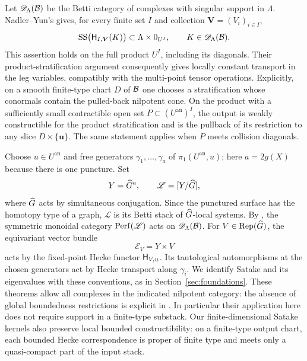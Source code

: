 Let $\mathscr D_\Lambda(\mathcal B)$ be the Betti category of complexes with
singular support in $\Lambda$.  Nadler--Yun's
\cite[Theorem~6.2.2]{NY} gives, for every finite set $I$ and collection
$\boldsymbol V=(V_i)_{i\in I}$,
\begin{equation}\label{eq:perverse-NY-support}
 \operatorname{SS}\bigl(\mathsf H_{I,\boldsymbol V}(K)\bigr)
       \subset \Lambda\times 0_{U^I},
       \qquad K\in\mathscr D_\Lambda(\mathcal B).
\end{equation}
This assertion holds on the full product $U^I$, including its diagonals.
Their product-stratification argument
\cite[Proposition~6.3.2]{NY} consequently gives locally constant
transport in the leg variables, compatibly with the multi-point tensor
operations.  Explicitly, on a smooth finite-type chart $D$ of $\mathcal B$ one
chooses a stratification whose conormals contain the pulled-back
nilpotent cone.  On the product with a sufficiently small contractible
open set $P\subset (U^{\mathrm{an}})^I$, the output is weakly
constructible for the product stratification and is the pullback of its restriction
to any slice $D\times\{\boldsymbol u\}$.  The same statement applies
when $P$ meets collision diagonals.

Choose $u\in U^{\mathrm{an}}$ and free generators
$\gamma_1,\ldots,\gamma_a$ of
$\pi_1(U^{\mathrm{an}},u)$; here $a=2g(X)$ because there is one
puncture.  Set
\begin{equation}\label{eq:perverse-spectral-stack}
 Y=\widehat G^{a},\qquad
 \mathscr L=[Y/\widehat G],
\end{equation}
where $\widehat G$ acts by simultaneous conjugation.  Since the punctured
surface has the homotopy type of a graph, $\mathscr L$ is its Betti
stack of $\widehat G$-local systems.  By
\cite[Theorem~6.3.7]{NY}, the symmetric monoidal category
$\operatorname{Perf}(\mathscr L)$ acts on $\mathscr D_\Lambda(\mathcal B)$.  For
$V\in\operatorname{Rep}(\widehat G)$, the equivariant vector bundle
\[
 \mathscr E_V=Y\times V
\]
acts by the fixed-point Hecke functor $\mathsf H_{V,u}$.  Its
tautological automorphisms at the chosen generators act by Hecke
transport along $\gamma_i$.  We identify Satake and its eigenvalues
with these conventions, as in Section~\ref{sec:foundations}.
These theorems allow all complexes in the indicated nilpotent category:
the absence of global boundedness restrictions is explicit in
\cite[\S5.1 and \S6.2]{NY}.  In particular their application here does
not require support in a finite-type substack.  Our finite-dimensional
Satake kernels also preserve local bounded constructibility: on a
finite-type output chart, each bounded Hecke correspondence is proper
of finite type and meets only a quasi-compact part of the input stack.

